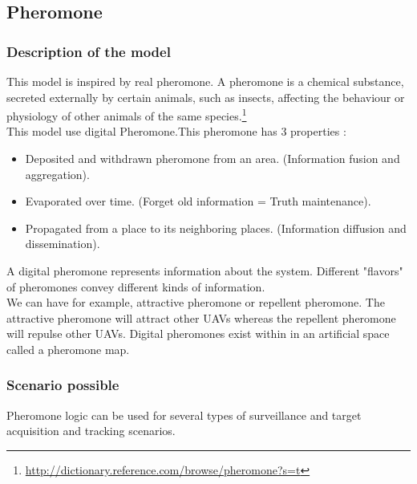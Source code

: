 \newpage

\subsection{Pheromone}

\subsubsection{Description of the model}

This model is inspired by real pheromone. A pheromone is a chemical substance, secreted externally by certain animals, such as insects, affecting the behaviour or physiology of other animals of the same species.\footnote{\url{http://dictionary.reference.com/browse/pheromone?s=t}}\\
This model use digital Pheromone.This pheromone has 3 properties :

\begin{itemize}
\item  Deposited and withdrawn pheromone from an area. (Information fusion and aggregation).
\item  Evaporated over time. (Forget old information = Truth maintenance).
\item  Propagated from a place to its neighboring places. (Information diffusion and dissemination). 
\end{itemize}

A  digital  pheromone  represents  information  about  the  system. Different  "flavors"  of  pheromones convey different kinds of information.\\ We can have for example, attractive pheromone or repellent pheromone. The attractive pheromone will attract other UAVs whereas the repellent pheromone will repulse other UAVs. Digital pheromones exist within in an artificial space called a pheromone map.

\subsubsection{Scenario possible}

Pheromone logic  can  be  used  for  several  types  of  surveillance  and target  acquisition  and  tracking scenarios.

